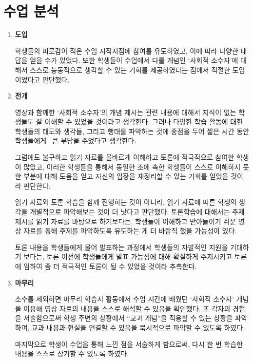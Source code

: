 \documentclass[10pt, a4paper, chapter]{oblivoir}
\begin{document}
    \section{수업 분석}
    \begin{enumerate}
        \item \textbf{도입}
        
        학생들의 피로감이 적은 수업 시작지점에 참여를 유도하였고, 이에 따라 다양한 대답을 얻을 수가 있었다. 
        또한 학생들이 수업에서 다룰 개념인 `사회적 소수자'에 대해서 스스로 능동적으로 생각할 수 있는 기회를 제공하였다는 점에서 적절한 도입이었다고 판단했다.
        \item \textbf{전개}
        
        영상과 함께한 `사회적 소수자'의 개념 제시는 관련 내용에 대해서 지식이 없는 학생들도 잘 이해할 수 있었을 것이라고 생각한다.
        그러나 다양한 학습 활동에 대한 학생들의 태도와 생각들, 그리고 행태를 파악하는 것에 중점을 두어 짧은 시간 동안 학생들에게~
        큰 부담을 주었다고 생각한다.

        그럼에도 불구하고 읽기 자료를 올바르게 이해하고 토론에 적극적으로 참여한 학생이 많았고, 이러한 학생들을 통해서 동일한 조에 속한 학생들이 
        스스로 이해하지 못한 부분에 대해 도움을 얻고 자신의 입장을 재정리할 수 있는 기회를 얻었을 것이라 판단한다. 

        읽기 자료와 토론 학습을 함께 진행하는 것이 아니라, 읽기 자료에 따른 학생의 생각을 개별적으로 파악해보는 것이 더 낫다고 판단했다. 토론학습에 대해서는 주제 제시를 읽기 자료를 바탕으로 하기보다는,
        학생들이 이해하고 받아들이기 쉬운 영상 자료를 통해 주제를 파악하도록 유도하는 게 더 바람직 했을 가능성이 있다.

        토론 내용을 학생들에게 물어 발표하는 과정에서 학생들의 자발적인 지원을 기대하기 보다는, 토론 이전에 학생들에게 발표 가능성에 대해 확실하게 
        주지시키고 토론에 임하여 좀 더 적극적인 토론이 될 수 있었을 것이라 추측한다.  
        \item \textbf{마무리}
        
        소수를 제외하면 마무리 학습지 활동에서 수업 시간에 배웠던 `사회적 소수자' 개념을 이용해 영상 자료의 내용을 스스로 해석할 수 있음을 확인했다. 
        또 각자의 경험을 서술함으로써 학생 주변의 상황에서 ``교과 개념''을 적용할 수 있는 상황을 파악하며, 교과 내용과 현실을 연결할 수 있음을 묵시적으로 
        파악할 수 있도록 하였다. 

        마지막으로 학생이 수업을 통해 느낀 점을 서술하게 함으로써, 다시 한 번 학습한 내용을 스스로 상기할 수 있도록 하였다. 

    \end{enumerate}
\end{document}
